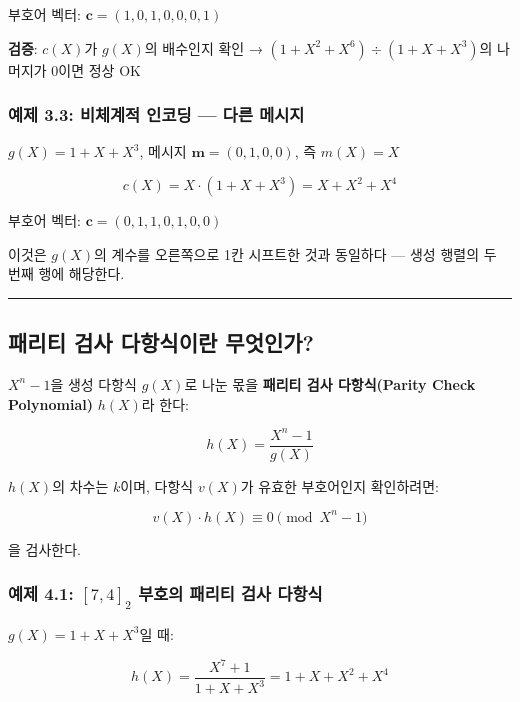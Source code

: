 \documentclass[
  oneside]{article}
\begin{document}
부호어 벡터: \(\mathbf{c} = (1, 0, 1, 0, 0, 0, 1)\)

\textbf{검증}: \(c(X)\)가 \(g(X)\)의 배수인지 확인 →
\((1 + X^2 + X^6) \div (1 + X + X^3)\)의 나머지가 \(0\)이면 정상 OK

\subsubsection{예제 3.3: 비체계적 인코딩 --- 다른
메시지}\label{uxc608uxc81c-3.3-uxbe44uxccb4uxacc4uxc801-uxc778uxcf54uxb529-uxb2e4uxb978-uxba54uxc2dcuxc9c0}

\(g(X) = 1 + X + X^3\), 메시지 \(\mathbf{m} = (0, 1, 0, 0)\), 즉
\(m(X) = X\)

\[c(X) = X \cdot (1 + X + X^3) = X + X^2 + X^4\]

부호어 벡터: \(\mathbf{c} = (0, 1, 1, 0, 1, 0, 0)\)

이것은 \(g(X)\)의 계수를 오른쪽으로 1칸 시프트한 것과 동일하다 --- 생성
행렬의 두 번째 행에 해당한다.

\begin{center}\rule{0.5\linewidth}{0.5pt}\end{center}

\subsection{패리티 검사 다항식이란
무엇인가?}\label{uxd328uxb9acuxd2f0-uxac80uxc0ac-uxb2e4uxd56duxc2dduxc774uxb780-uxbb34uxc5c7uxc778uxac00}

\(X^n - 1\)을 생성 다항식 \(g(X)\)로 나눈 몫을 \textbf{패리티 검사
다항식(Parity Check Polynomial)} \(h(X)\)라 한다:

\[h(X) = \frac{X^n - 1}{g(X)}\]

\(h(X)\)의 차수는 \(k\)이며, 다항식 \(v(X)\)가 유효한 부호어인지
확인하려면:

\[v(X) \cdot h(X) \equiv 0 \pmod{X^n - 1}\]

을 검사한다.

\subsubsection{\texorpdfstring{예제 4.1: \([7, 4]_2\) 부호의 패리티 검사
다항식}{예제 4.1: {[}7, 4{]}\_2 부호의 패리티 검사 다항식}}\label{uxc608uxc81c-4.1-7-4_2-uxbd80uxd638uxc758-uxd328uxb9acuxd2f0-uxac80uxc0ac-uxb2e4uxd56duxc2dd}

\(g(X) = 1 + X + X^3\)일 때:

\[h(X) = \frac{X^7 + 1}{1 + X + X^3} = 1 + X + X^2 + X^4\]
\end{document}
